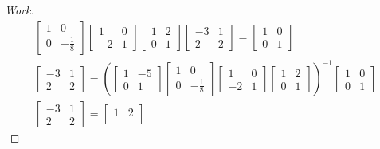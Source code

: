 \documentclass{article}
\begin{document}
\begin{enumerate}
{\begin{proof}[Work]
\begin{align*}
\begin{bmatrix}
          1 & 0            \\
          0 & -\frac{1}{8}
        \end{bmatrix}
        \begin{bmatrix}
          1  & 0 \\
          -2 & 1
        \end{bmatrix}
        \begin{bmatrix}
          1 & 2 \\
          0 & 1
        \end{bmatrix}
        \begin{bmatrix}
          -3 & 1 \\
          2  & 2
        \end{bmatrix} =
        \begin{bmatrix}
          1 & 0 \\
          0 & 1
        \end{bmatrix} \\
        \begin{bmatrix}
          -3 & 1 \\
          2  & 2
        \end{bmatrix} =
        \left(\begin{bmatrix}
                1 & -5 \\
                0 & 1
              \end{bmatrix}
        \begin{bmatrix}
          1 & 0            \\
          0 & -\frac{1}{8}
        \end{bmatrix}
        \begin{bmatrix}
          1  & 0 \\
          -2 & 1
        \end{bmatrix}
        \begin{bmatrix}
          1 & 2 \\
          0 & 1
        \end{bmatrix}\right)^{-1}
        \begin{bmatrix}
          1 & 0 \\
          0 & 1
        \end{bmatrix} \\
        \begin{bmatrix}
          -3 & 1 \\
          2  & 2
        \end{bmatrix} =
        \begin{bmatrix}
          1 & 2 \\

\end{bmatrix}
\end{align*}
\end{proof}}
\end{enumerate}
\end{document}
